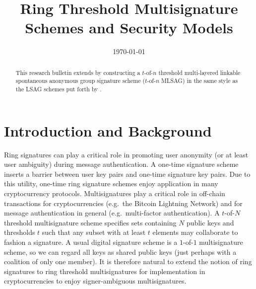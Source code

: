 \documentclass{mrl}
\title{Ring Threshold Multisignature Schemes and Security Models}
\date{\today}
\theoremstyle{definition}
\begin{document}

\begin{abstract}
This research bulletin extends \cite{noether2016ring} by constructing a $t$-of-$n$ threshold multi-layered linkable spontaneous anonymous group signature scheme ($t$-of-$n$ MLSAG) in the same style as the LSAG schemes put forth by \cite{liu2004linkable}. %
\end{abstract}


\section{Introduction and Background}

Ring signatures can play a critical role in promoting user anonymity (or at least user ambiguity) during message authentication. A one-time signature scheme inserts a barrier between user key pairs and one-time signature key pairs. Due to this utility, one-time ring signature schemes enjoy application in many cryptocurrency protocols. Multisignatures play a critical role in off-chain transactions for cryptocurrencies (e.g.\ the Bitcoin Lightning Network) and for message authentication in general (e.g.\ multi-factor authentication). A $t$-of-$N$ threshold multisignature scheme specifies sets containing $N$ public keys and thresholds $t$ such that any subset with at least $t$ elements may collaborate to fashion a signature. A usual digital signature scheme is a $1$-of-$1$ multisignature scheme, so we can regard all keys as shared public keys (just perhaps with a coalition of only one member). It is therefore natural to extend the notion of ring signatures to ring threshold multisignatures for implementation in cryptocurrencies to enjoy signer-ambiguous multisignatures. 
\end{document}
